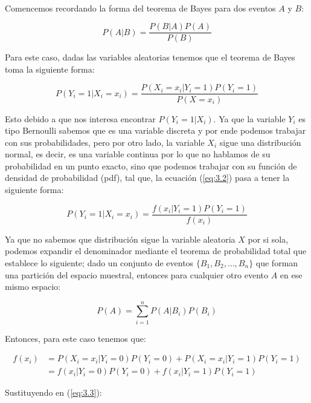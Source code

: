 \noindent{}\\

Comencemos recordando la forma del teorema de Bayes para dos eventos $A$ y $B$:

\begin{equation}
    P(A|B)=\frac{P(B|A)P(A)}{P(B)}    
    \label{eq:3.1}
\end{equation}

Para este caso, dadas las variables aleatorias tenemos que el teorema de Bayes toma la siguiente forma:

\begin{equation}
    P(Y_i=1|X_i=x_i)=\frac{P(X_i=x_i|Y_i=1)P(Y_i=1)}{P(X=x_i)}  
    \label{eq:3.2}
\end{equation}

Esto debido a que nos interesa encontrar $P(Y_i=1|X_i)$. Ya que la variable $Y_i$ es tipo Bernoulli sabemos que es una variable discreta y por ende podemos trabajar con sus probabilidades, pero por otro lado, la variable $X_i$ sigue una distribución normal, es decir, es una variable continua por lo que no hablamos de su probabilidad en un punto exacto, sino que podemos trabajar con su función de densidad de probabilidad (pdf), tal que, la ecuación (\ref{eq:3.2}) pasa a tener la siguiente forma:

\begin{equation}
    P(Y_i=1|X_i=x_i)=\frac{f(x_i|Y_i=1)P(Y_i=1)}{f(x_i)}
    \label{eq:3.3}
\end{equation}

Ya que no sabemos que distribución sigue la variable aleatoria $X$ por si sola, podemos expandir el denominador mediante el teorema de probabilidad total que establece lo siguiente; dado un conjunto de eventos $\{B_1,B_2,\dots,B_n\}$ que forman una partición del espacio muestral, entonces para cualquier otro evento $A$ en ese mismo espacio:

\begin{equation}
    P(A)=\sum_{i=1}^{n}P(A|B_i)P(B_i)
    \label{eq:3.4}
\end{equation}

Entonces, para este caso tenemos que:

\begin{align*}
    f(x_i)&=P(X_i=x_i|Y_i=0)P(Y_i=0)+P(X_i=x_i|Y_i=1)P(Y_i=1)\\[0.1cm]
          &=f(x_i|Y_i=0)P(Y_i=0)+f(x_i|Y_i=1)P(Y_i=1)
\end{align*}

\newpage
Sustituyendo en (\ref{eq:3.3}):

